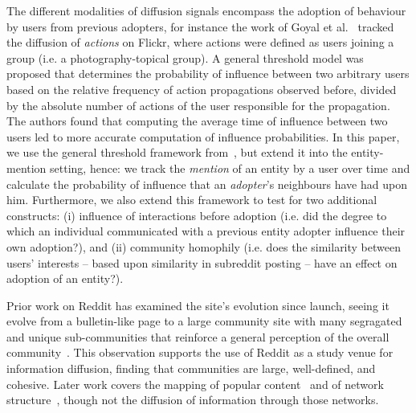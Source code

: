 \documentclass[sigconf,anonymous,review]{acmart}
\begin{document}
The different modalities of diffusion signals encompass the adoption of behaviour by users from previous adopters, for instance the work of Goyal et al.~\cite{goyal2010learning} tracked the diffusion of \emph{actions} on Flickr, where actions were defined as users joining a group (i.e. a photography-topical group).
A general threshold model was proposed that determines the probability of influence between two arbitrary users based on the relative frequency of action propagations observed before, divided by the absolute number of actions of the user responsible for the propagation.
The authors found that computing the average time of influence between two users led to more accurate computation of influence probabilities.
In this paper, we use the general threshold framework from~\cite{goyal2010learning}, but extend it into the entity-mention setting, hence: we track the \emph{mention} of an entity by a user over time and calculate the probability of influence that an \emph{adopter}'s neighbours have had upon him.
Furthermore, we also extend this framework to test for two additional constructs: (i) influence of interactions before adoption (i.e. did the degree to which an individual communicated with a previous entity adopter influence their own adoption?), and (ii) community homophily (i.e. does the similarity between users' interests -- based upon similarity in subreddit posting -- have an effect on adoption of an entity?).

Prior work on Reddit has examined the site's evolution since launch, seeing it evolve from a bulletin-like page to a large community site with many segragated and unique sub-communities that reinforce a general perception of the overall community~\cite{singer2014evolution}.
This observation supports the use of Reddit as a study venue for information diffusion, finding that communities are large, well-defined, and cohesive.
Later work covers the mapping of popular content~\cite{weninger2015random} and of network structure~\cite{olson2015navigating}, though not the diffusion of information through those networks.
\end{document}
